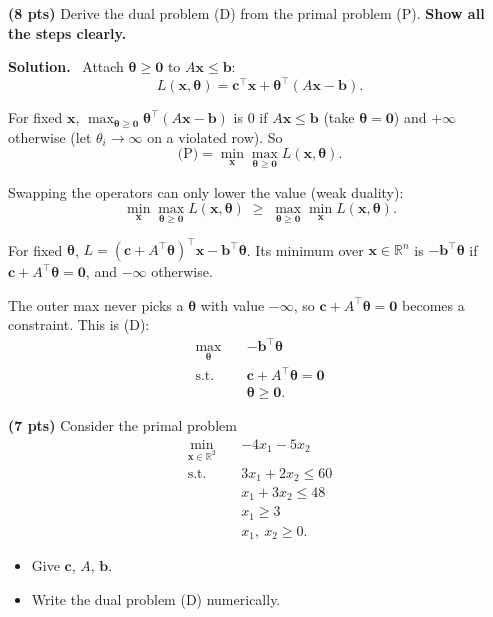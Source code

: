\documentclass[10pt]{article}
\newenvironment{solution}
  {\par\smallskip\begingroup\color{solink}\textbf{Solution.}\ }
  {\par\endgroup}
\begin{document}
\begin{parts}
\item \textbf{(8 pts)} Derive the dual problem (D) from the primal problem (P). \textbf{Show all the steps clearly.}

\begin{solution}
Attach $\bm{\theta} \ge \bm{0}$ to $A\bm{x} \le \bm{b}$:
\[
  L(\bm{x}, \bm{\theta}) = \bm{c}^{\top}\bm{x} + \bm{\theta}^{\top}(A\bm{x} - \bm{b}).
\]
\begin{steps}
\item For fixed $\bm{x}$, $\max_{\bm{\theta} \ge \bm{0}} \bm{\theta}^{\top}(A\bm{x} - \bm{b})$ is $0$ if $A\bm{x} \le \bm{b}$ (take $\bm{\theta} = \bm{0}$)
  and $+\infty$ otherwise (let $\theta_i \to \infty$ on a violated row). So
  \[
    \text{(P)} = \min_{\bm{x}} \max_{\bm{\theta} \ge \bm{0}} L(\bm{x}, \bm{\theta}).
  \]
\item Swapping the operators can only lower the value (weak duality):
  \[
    \min_{\bm{x}} \max_{\bm{\theta} \ge \bm{0}} L(\bm{x}, \bm{\theta}) \;\ge\; \max_{\bm{\theta} \ge \bm{0}} \min_{\bm{x}} L(\bm{x}, \bm{\theta}).
  \]
\item For fixed $\bm{\theta}$, $L = (\bm{c} + A^{\top}\bm{\theta})^{\top}\bm{x} - \bm{b}^{\top}\bm{\theta}$. Its minimum over
  $\bm{x} \in \mathbb{R}^n$ is $-\bm{b}^{\top}\bm{\theta}$ if $\bm{c} + A^{\top}\bm{\theta} = \bm{0}$, and $-\infty$ otherwise.
\item The outer max never picks a $\bm{\theta}$ with value $-\infty$, so $\bm{c} + A^{\top}\bm{\theta} = \bm{0}$ becomes
  a constraint. This is (D):
  \[
  \begin{aligned}
    \max_{\bm{\theta}} \quad & -\bm{b}^{\top}\bm{\theta} \\
    \text{s.t.} \quad & \bm{c} + A^{\top}\bm{\theta} = \bm{0} \\
                      & \bm{\theta} \ge \bm{0} .
  \end{aligned}
  \]
\end{steps}
\end{solution}

\item \textbf{(7 pts)} Consider the primal problem
\[
\begin{aligned}
  \min_{\bm{x} \in \mathbb{R}^2} \quad & -4x_1 - 5x_2 \\
  \text{s.t.} \quad & 3x_1 + 2x_2 \le 60 \\
                    & x_1 + 3x_2 \le 48 \\
                    & x_1 \ge 3 \\
                    & x_1,\ x_2 \ge 0 .
\end{aligned}
\]
  \begin{itemize}[leftmargin=2.2em, itemsep=2pt, topsep=3pt]
    \item Give $\bm{c}$, $A$, $\bm{b}$.
    \item Write the dual problem (D) numerically.
  \end{itemize}


\end{parts}
\end{document}
